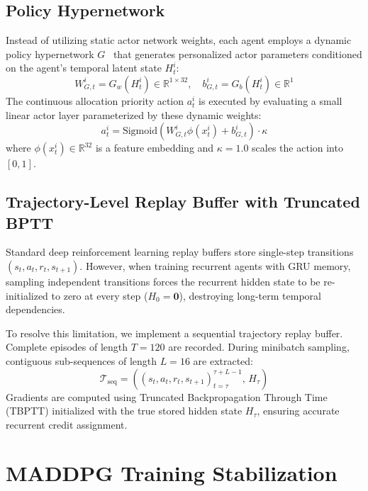 \documentclass[journal]{IEEEtran}
\begin{document}
\subsection{Policy Hypernetwork}
Instead of utilizing static actor network weights, each agent employs a dynamic policy hypernetwork $G$~\cite{ha2017hypernetworks} that generates personalized actor parameters conditioned on the agent's temporal latent state $H_t^i$:
\begin{equation}
W_{G,t}^i = G_w(H_t^i) \in \mathbb{R}^{1 \times 32}, \quad b_{G,t}^i = G_b(H_t^i) \in \mathbb{R}^1
\label{eq:hypernetwork}
\end{equation}
The continuous allocation priority action $a_t^i$ is executed by evaluating a small linear actor layer parameterized by these dynamic weights:
\begin{equation}
a_t^i = \text{Sigmoid}\left(W_{G,t}^i \phi(x_t^i) + b_{G,t}^i\right) \cdot \kappa
\label{eq:actor_action}
\end{equation}
where $\phi(x_t^i) \in \mathbb{R}^{32}$ is a feature embedding and $\kappa = 1.0$ scales the action into $[0, 1]$.

\subsection{Trajectory-Level Replay Buffer with Truncated BPTT}
Standard deep reinforcement learning replay buffers store single-step transitions $(s_t, a_t, r_t, s_{t+1})$. However, when training recurrent agents with GRU memory, sampling independent transitions forces the recurrent hidden state to be re-initialized to zero at every step ($H_0 = \mathbf{0}$), destroying long-term temporal dependencies.

To resolve this limitation, we implement a sequential trajectory replay buffer. Complete episodes of length $T=120$ are recorded. During minibatch sampling, contiguous sub-sequences of length $L=16$ are extracted:
\begin{equation}
\mathcal{T}_{\text{seq}} = \left( (s_t, a_t, r_t, s_{t+1})_{t=\tau}^{\tau+L-1}, \, H_{\tau} \right)
\end{equation}
Gradients are computed using Truncated Backpropagation Through Time (TBPTT) initialized with the true stored hidden state $H_{\tau}$, ensuring accurate recurrent credit assignment.

\section{MADDPG Training Stabilization}
\label{sec:stabilization}
\end{document}
